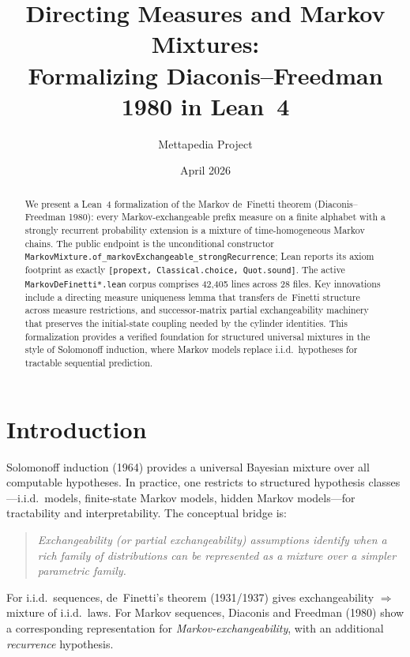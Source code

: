 \documentclass[11pt,a4paper]{article}
\title{Directing Measures and Markov Mixtures:\\[0.3em]
\large Formalizing Diaconis--Freedman 1980 in Lean~4}
\author{Mettapedia Project}
\date{April 2026}
\theoremstyle{definition}
\begin{document}
\maketitle

\begin{abstract}
We present a Lean~4 formalization of the Markov de~Finetti theorem
(Diaconis--Freedman 1980): every Markov-exchangeable prefix measure on a
finite alphabet with a strongly recurrent probability extension is a mixture
of time-homogeneous Markov chains. The public endpoint is the unconditional
constructor \texttt{MarkovMixture.of\_markovExchangeable\_strongRecurrence};
Lean reports its axiom footprint as exactly
\texttt{[propext, Classical.choice, Quot.sound]}. The active
\texttt{MarkovDeFinetti*.lean} corpus comprises 42,405 lines across 28 files.
Key innovations include a directing measure uniqueness lemma that transfers
de~Finetti structure across measure restrictions, and successor-matrix partial
exchangeability machinery that preserves the initial-state coupling needed by
the cylinder identities. This formalization provides a verified foundation for
structured universal mixtures in the style of Solomonoff induction, where
Markov models replace i.i.d.\ hypotheses for tractable sequential prediction.
\end{abstract}

\tableofcontents

\section{Introduction}

Solomonoff induction (1964) provides a universal Bayesian mixture over all
computable hypotheses. In practice, one restricts to structured hypothesis
classes---i.i.d.\ models, finite-state Markov models, hidden Markov
models---for tractability and interpretability. The conceptual bridge is:

\begin{quote}
\emph{Exchangeability (or partial exchangeability) assumptions identify when
a rich family of distributions can be represented as a mixture over a simpler
parametric family.}
\end{quote}

For i.i.d.\ sequences, de~Finetti's theorem (1931/1937) gives exchangeability
$\Rightarrow$ mixture of i.i.d.\ laws. For Markov sequences, Diaconis and
Freedman (1980) show a corresponding representation for \emph{Markov-exchangeability},
with an additional \emph{recurrence} hypothesis.
\end{document}
